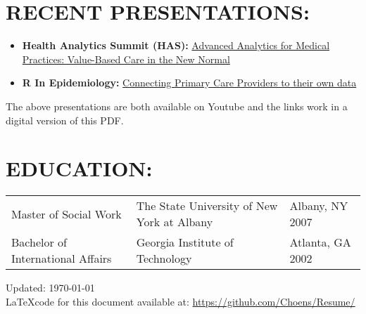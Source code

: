 \documentclass[line, mm, 10pt]{res}
\begin{document}
\begin{resume}
  \section{RECENT PRESENTATIONS:}
  \begin{itemize}
    \item {\bf Health Analytics Summit (HAS):} {\href{https://www.youtube.com/watch?v=--vqwbJucPs}{Advanced Analytics for Medical Practices: Value-Based Care in the New Normal}}
    \item {\bf R In Epidemiology:} {\href{https://www.youtube.com/watch?v=-zhTXiiCj58}{Connecting Primary Care Providers to their own data}}
    \end{itemize}

    The above presentations are both available on Youtube and the
    links work in a digital version of this PDF.
  
  \section{EDUCATION:}
  \begin{tabular} {p{2.25in} p{2.75in} p{2in}}
    Master of Social Work & The State University of New  York at Albany & Albany, NY 2007 \\
    Bachelor of International Affairs & Georgia Institute of Technology & Atlanta, GA 2002 \\
  \end{tabular}


\end{resume}

\vspace{.25in}
Updated: \today \\
\LaTeX code for this document available at:
\href{https://github.com/Choens/Resume/}{https://github.com/Choens/Resume/}
\end{document}
